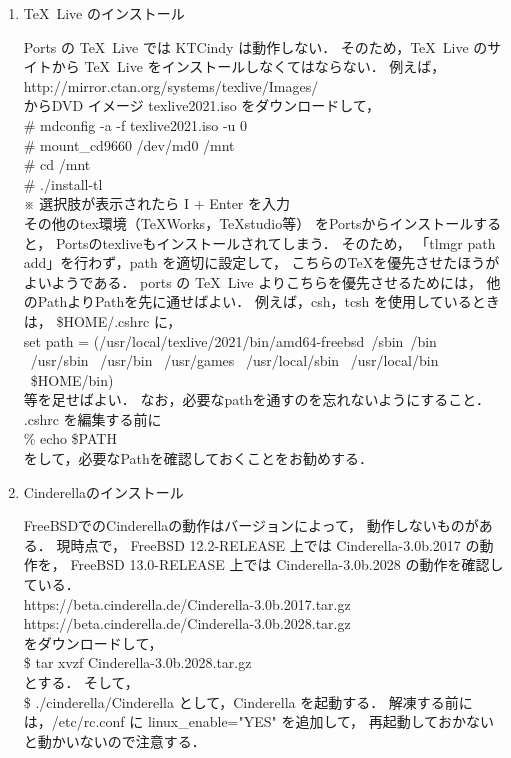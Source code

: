 \documentclass[a4paper,12pt]{jarticle}
\begin{document}
\begin{enumerate}
\item \TeX \  Live のインストール

Ports の \TeX \  Live では 
K\raisebox{-0.3zw}{E}TCindy 
は動作しない．
そのため，\TeX \  Live のサイトから 
\TeX \  Live をインストールしなくてはならない．
例えば，
\\[0.5zw]
http://mirror.ctan.org/systems/texlive/Images/
\\[0.5zw]
からDVD イメージ texlive2021.iso をダウンロードして，
\\[0.5zw]
\noindent
\# mdconfig -a -f texlive2021.iso -u 0
\\
\noindent
\# mount\_cd9660 /dev/md0 /mnt
\\
\noindent
\# cd /mnt
\\
\noindent
\# ./install-tl
\\[0.5zw]
※ 選択肢が表示されたら I + Enter を入力
\\[0.5zw]
その他のtex環境（\TeX Works，\TeX studio等）
をPortsからインストールすると，
Portsのtexliveもインストールされてしまう．
そのため，
「tlmgr path add」を行わず，path を適切に設定して，
こちらの\TeX を優先させたほうがよいようである．
ports の \TeX \  Live よりこちらを優先させるためには，
他のPathよりPathを先に通せばよい．
例えば，csh，tcsh を使用しているときは，
\$HOME/.cshrc に，
\\[0.5zw]
\noindent
set path = (/usr/local/texlive/2021/bin/amd64-freebsd\  /sbin\  /bin \  /usr/sbin \ /usr/bin \ /usr/games \ /usr/local/sbin \  /usr/local/bin \    \$HOME/bin)
\\[0.5zw]
等を足せばよい．
なお，必要なpathを通すのを忘れないようにすること．
.cshrc を編集する前に
\\[0.5zw]
\% echo \$PATH
\\[0.5zw]
をして，必要なPathを確認しておくことをお勧めする．

\item Cinderellaのインストール

FreeBSDでのCinderellaの動作はバージョンによって，
動作しないものがある．
現時点で，
FreeBSD 12.2-RELEASE 上では Cinderella-3.0b.2017 の動作を，
FreeBSD 13.0-RELEASE 上では Cinderella-3.0b.2028 の動作を確認している．
\\[0.5zw]
https://beta.cinderella.de/Cinderella-3.0b.2017.tar.gz
\\
https://beta.cinderella.de/Cinderella-3.0b.2028.tar.gz
\\[0.5zw]
をダウンロードして，
\\[0.5zw]
\$ tar xvzf  Cinderella-3.0b.2028.tar.gz
\\[0.5zw]
とする．
そして，
\\[0.5zw]
\$ ./cinderella/Cinderella 
として，Cinderella を起動する．
解凍する前には，/etc/rc.conf に
linux\_enable="YES" を追加して，
再起動しておかないと動かいないので注意する．


\end{enumerate}
\end{document}

